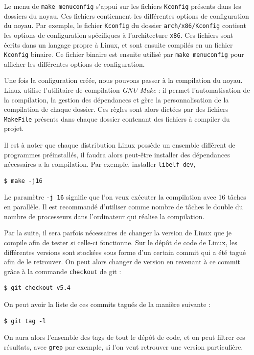 Le menu de \texttt{make menuconfig} s'appui sur les fichiers \texttt{Kconfig} présents dans les dossiers du noyau. Ces fichiers contiennent les différentes options de configuration du noyau. Par exemple, le fichier \texttt{Kconfig} du dossier \texttt{arch/x86/Kconfig} contient les options de configuration spécifiques à l'architecture \texttt{x86}. Ces fichiers sont écrits dans un langage propre à Linux, et sont ensuite compilés en un fichier \texttt{Kconfig} binaire. Ce fichier binaire est ensuite utilisé par \texttt{make menuconfig} pour afficher les différentes options de configuration. 

Une fois la configuration créée, nous pouvons passer à la compilation du noyau. Linux utilise l'utilitaire de compilation \textit{GNU Make} : il permet l'automatisation de la compilation, la gestion des dépendances et gère la personnalisation de la compilation de chaque dossier. Ces règles sont alors dictées par des fichiers \texttt{MakeFile} présents dans chaque dossier contenant des fichiers à compiler du projet.

Il est à noter que chaque distribution Linux possède un ensemble différent de programmes préinstallés, il faudra alors peut-être installer des dépendances nécessaires a la compilation. Par exemple, installer \texttt{libelf-dev}, \texttt{}


\newpage %
\begin{lstlisting}[style=command, caption=Compilation sur plusieurs processeurs] 
$ make -j16
\end{lstlisting}

Le paramètre \texttt{-j 16} signifie que l'on veux exécuter la compilation avec 16 tâches en parallèle. Il est recommandé d'utiliser comme nombre de tâches le double du nombre de processeurs dans l'ordinateur qui réalise la compilation.

Par la suite, il sera parfois nécessaires de changer la version de Linux que je compile afin de tester si celle-ci fonctionne. Sur le dépôt de code de Linux, les différentes versions sont stockées sous forme d'un certain commit qui a été tagué afin de le retrouver. On peut alors changer de version en revenant à ce commit grâce à la commande \texttt{checkout} de \gls{git} : 
\begin{lstlisting}[style=command, caption=Retour sur un commit tagé]
$ git checkout v5.4
\end{lstlisting}
On peut avoir la liste de ces commits tagués de la manière suivante : 
\begin{lstlisting}[style=command, caption=Comment lister les tags]
$ git tag -l
\end{lstlisting}
On aura alors l'ensemble des tags de tout le dépôt de code, et on peut filtrer ces résultats, avec \texttt{grep} par exemple, si l'on veut retrouver une version particulière.

